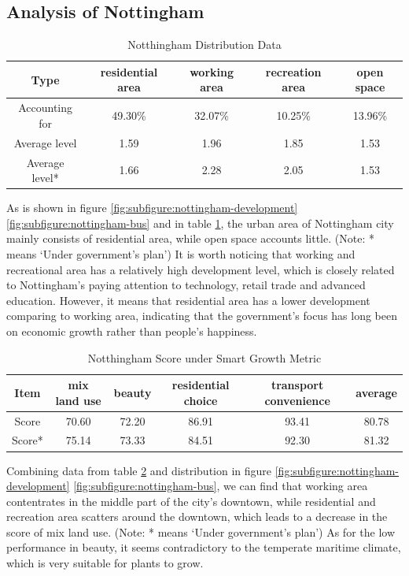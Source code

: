 \subsection{Analysis of Nottingham}
\begin{table}[t]
\centering
  \begin{tabular}{c|cccc}
    \hline
    Type & residential area & working area & recreation area & open space \\
    \hline
    Accounting for & 49.30\% & 32.07\% & 10.25\% & 13.96\% \\
    \hline
    Average level & 1.59 & 1.96 & 1.85 & 1.53 \\
    Average level* & 1.66 & 2.28 & 2.05 & 1.53 \\
    \hline
  \end{tabular}
  \caption{Notthingham Distribution Data}
  \label{tab:nottingham-data}
\end{table}

As is shown in figure \ref{fig:subfigure:nottingham-development} \ref{fig:subfigure:nottingham-bus} and in table \ref{tab:nottingham-data}, the urban area of Nottingham city mainly consists of residential area, while open space accounts little. (Note: * means `Under government's plan')
It is worth noticing that working and recreational area has a relatively high development level, which is closely related to Nottingham's paying attention to technology, retail trade and advanced education.
However, it means that residential area has a lower development comparing to working area, indicating that the government's focus has long been on economic growth rather than people's happiness.\\
\begin{table}[t]
\centering
  \begin{tabular}{c|cccc|c}
    \hline
    Item & mix land use & beauty & residential choice & transport convenience & average \\
    \hline
    Score & 70.60 & 72.20 & 86.91 & 93.41 & 80.78 \\
    Score* & 75.14 & 73.33 & 84.51 & 92.30 & 81.32 \\
    \hline
  \end{tabular}
  \caption{Notthingham Score under Smart Growth Metric}
  \label{tab:nottingham-score}
\end{table}

Combining data from table \ref{tab:nottingham-score} and distribution in figure \ref{fig:subfigure:nottingham-development} \ref{fig:subfigure:nottingham-bus}, we can find that working area contentrates in the middle part of the city's downtown, while residential and recreation area scatters around the downtown, which leads to a decrease in the score of mix land use. (Note: * means `Under government's plan')
As for the low performance in beauty, it seems contradictory to the temperate maritime climate, which is very suitable for plants to grow.\\

